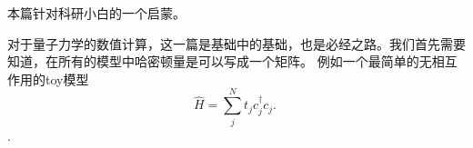 本篇针对科研小白的一个启蒙。

对于量子力学的数值计算，这一篇是基础中的基础，也是必经之路。我们首先需要知道，在所有的模型中哈密顿量是可以写成一个矩阵。
例如一个最简单的无相互作用的toy模型
\begin{equation}\label{ham1}
\hat{H}=  \sum_j^{N} t_j c_j^{\dagger}c_j.~
\end{equation}
.
